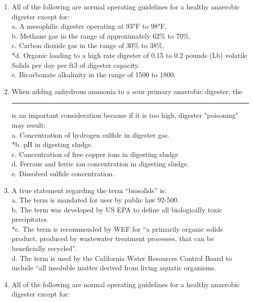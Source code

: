 \documentclass{article}
\begin{document}
\begin{enumerate}
\item  All of the following are normal operating guidelines for a healthy anaerobic digester except for: \\

a. A mesophilic digester operating at 93°F to 98°F. \\
b. Methane gas in the range of approximately 62\% to 70\%. \\
c. Carbon dioxide gas in the range of 30\% to 38\%. \\
*d. Organic loading to a high rate digester of 0.15 to 0.2 pounds (Lb) volatile Solids per day per ft3 of digester capacity. \\
e. Bicarbonate alkalinity in the range of 1500 to 1800. \\

\item  When adding anhydrous ammonia to a sour primary anaerobic digester, the\rule{1.5cm}{0.3cm} is an important consideration because if it is too high, digester "poisoning" may result: \\

a. Concentration of hydrogen sulfide in digester gas. \\
*b. pH in digesting sludge. \\
c. Concentration of free copper ions in digesting sludge \\
d. Ferrous and ferric ion concentration in digesting sludge. \\
e. Dissolved sulfide concentration. \\

\item  A true statement regarding the term “biosolids” is: \\

a. The term is mandated for user by public law 92-500. \\
b. The term was developed by US EPA to define all biologically toxic precipitates. \\
*c. The term is recommended by WEF for “a primarily organic solids product, produced by wastewater treatment processes, that can be beneficially recycled”. \\
d. The term is used by the California Water Resources Control Board to include “all insoluble matter derived from living aquatic organisms. \\

\item  All of the following are normal operating guidelines for a healthy anaerobic digester except for: \\


\end{enumerate}
\end{document}
